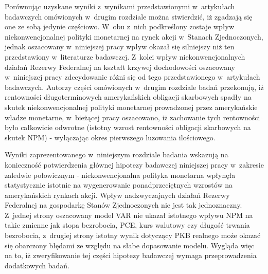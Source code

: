 Porównując uzyskane wyniki z~wynikami przedstawionymi w~artykułach badawczych omówionych w~drugim rozdziale można stwierdzić, iż zgadzają się one ze sobą jedynie częściowo. W~obu z~nich podkreślony zostaje wpływ niekonwencjonalnej polityki monetarnej na rynek akcji w~Stanach Zjednoczonych, jednak oszacowany w~niniejszej pracy wpływ okazał się silniejszy niż ten przedstawiony w~literaturze badawczej. Z~kolei wpływ niekonwencjonalnych działań Rezerwy Federalnej na kształt krzywej dochodowości oszacowany w~niniejszej pracy zdecydowanie różni się od tego przedstawionego w~artykułach badawczych. Autorzy części omówionych w~drugim rozdziale badań przekonują, iż rentowności długoterminowych amerykańskich obligacji skarbowych spadły na skutek niekonwencjonalnej polityki monetarnej prowadzonej przez amerykańskie władze monetarne, w~bieżącej pracy oszacowano, iż zachowanie tych rentowności było całkowicie odwrotne (istotny wzrost rentowności obligacji skarbowych na skutek \acs{NPM}) - wyłączając okres pierwszego luzowania ilościowego.

Wyniki zaprezentowanego w~niniejszym rozdziale badania wskazują na konieczność potwierdzenia głównej hipotezy badawczej niniejszej pracy w~zakresie zaledwie połowicznym - niekonwencjonalna polityka monetarna wpłynęła statystycznie istotnie na wygenerowanie ponadprzeciętnych wzrostów na amerykańskich rynkach akcji. Wpływ nadzwyczajnych działań Rezerwy Federalnej na gospodarkę Stanów Zjednoczonych nie jest tak jednoznaczny. Z~jednej strony oszacowany model \acs{VAR} nie ukazał istotnego wpływu \acs{NPM} na takie zmienne jak stopa bezrobocia, \acs{PCE}, kurs walutowy czy długość trwania bezrobocia, z~drugiej strony istotny wynik dotyczący \acs{PKB} realnego może okazać się obarczony błędami ze względu na słabe dopasowanie modelu. Wygląda więc na to, iż zweryfikowanie tej części hipotezy badawczej wymaga przeprowadzenia dodatkowych badań.